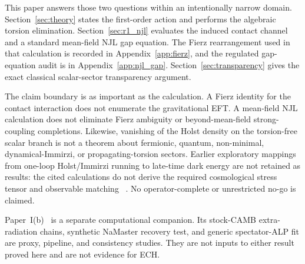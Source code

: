 \documentclass[aps,prd,twocolumn,superscriptaddress,showpacs,preprintnumbers,nofootinbib,longbibliography,floatfix]{revtex4-2}
\begin{document}
This paper answers those two questions within an intentionally narrow domain.
Section~\ref{sec:theory} states the first-order action and performs the
algebraic torsion elimination.  Section~\ref{sec:r1_njl} evaluates the induced
contact channel and a standard mean-field NJL gap equation.  The Fierz
rearrangement used in that calculation is recorded in
Appendix~\ref{app:fierz}, and the regulated gap-equation audit is in
Appendix~\ref{app:njl_gap}.  Section~\ref{sec:transparency} gives the exact
classical scalar-sector transparency argument.

The claim boundary is as important as the calculation.  A Fierz identity for
the contact interaction does not enumerate the gravitational EFT.  A
mean-field NJL calculation does not eliminate Fierz ambiguity or
beyond-mean-field strong-coupling completions.  Likewise, vanishing of the
Holst density on the torsion-free scalar branch is not a theorem about
fermionic, quantum, non-minimal, dynamical-Immirzi, or propagating-torsion
sectors.  Earlier exploratory mappings from one-loop Holst/Immirzi running to
late-time dark energy are not retained as results: the cited calculations do
not derive the required cosmological stress tensor and observable matching
~\cite{ShapiroTeixeira2014,BenedettiSpeziale2011run}.  No operator-complete or
unrestricted no-go is claimed.

Paper~I(b)~\cite{Golden2026P1b} is a separate computational companion.  Its
stock-CAMB extra-radiation chains, synthetic NaMaster recovery test, and
generic spectator-ALP fit are proxy, pipeline, and consistency studies.  They
are not inputs to either result proved here and are not evidence for ECH.
\end{document}

